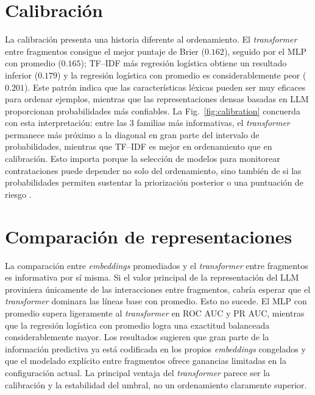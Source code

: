 \section{Calibración}
La calibración presenta una historia diferente al ordenamiento. El \textit{transformer} entre fragmentos consigue el mejor puntaje de Brier ($0.162$), seguido por el MLP con promedio ($0.165$); TF--IDF más regresión logística obtiene un resultado inferior ($0.179$) y la regresión logística con promedio es considerablemente peor ($0.201$). Este patrón indica que las características léxicas pueden ser muy eficaces para ordenar ejemplos, mientras que las representaciones densas basadas en LLM proporcionan probabilidades más confiables. La Fig.~\ref{fig:calibration} concuerda con esta interpretación: entre las 3 familias más informativas, el \textit{transformer} permanece más próximo a la diagonal en gran parte del intervalo de probabilidades, mientras que TF--IDF es mejor en ordenamiento que en calibración. Esto importa porque la selección de modelos para monitorear contrataciones puede depender no solo del ordenamiento, sino también de si las probabilidades permiten sustentar la priorización posterior o una puntuación de riesgo \parencite{silvafilho2023calibration}.

\section{Comparación de representaciones}
La comparación entre \textit{embeddings} promediados y el \textit{transformer} entre fragmentos es informativa por sí misma. Si el valor principal de la representación del LLM proviniera únicamente de las interacciones entre fragmentos, cabría esperar que el \textit{transformer} dominara las líneas base con promedio. Esto no sucede. El MLP con promedio supera ligeramente al \textit{transformer} en ROC AUC y PR AUC, mientras que la regresión logística con promedio logra una exactitud balanceada considerablemente mayor. Los resultados sugieren que gran parte de la información predictiva ya está codificada en los propios \textit{embeddings} congelados y que el modelado explícito entre fragmentos ofrece ganancias limitadas en la configuración actual. La principal ventaja del \textit{transformer} parece ser la calibración y la estabilidad del umbral, no un ordenamiento claramente superior.

